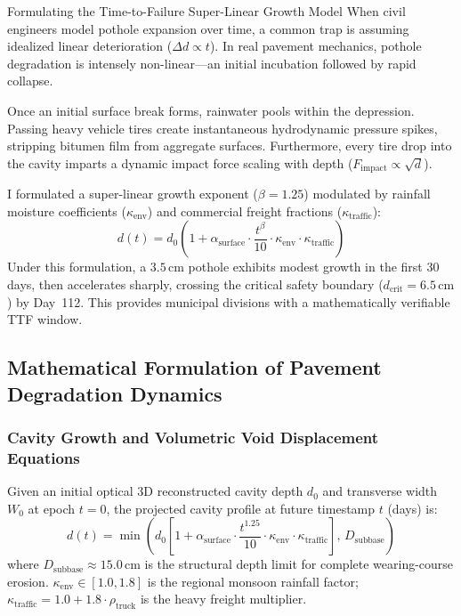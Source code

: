 \begin{designreflection}{Formulating the Time-to-Failure Super-Linear Growth Model}
When civil engineers model pothole expansion over time, a common trap is assuming idealized linear deterioration ($\Delta d \propto t$). In real pavement mechanics, pothole degradation is intensely non-linear---an initial incubation followed by rapid collapse.

Once an initial surface break forms, rainwater pools within the depression. Passing heavy vehicle tires create instantaneous hydrodynamic pressure spikes, stripping bitumen film from aggregate surfaces. Furthermore, every tire drop into the cavity imparts a dynamic impact force scaling with depth ($F_{\text{impact}} \propto \sqrt{d}$).

I formulated a super-linear growth exponent ($\beta = 1.25$) modulated by rainfall moisture coefficients ($\kappa_{\text{env}}$) and commercial freight fractions ($\kappa_{\text{traffic}}$):
\[
d(t) = d_0 \left( 1 + \alpha_{\text{surface}} \cdot \frac{t^\beta}{10} \cdot \kappa_{\text{env}} \cdot \kappa_{\text{traffic}} \right)
\]
Under this formulation, a $3.5\,\text{cm}$ pothole exhibits modest growth in the first 30 days, then accelerates sharply, crossing the critical safety boundary ($d_{\text{crit}} = 6.5\,\text{cm}$) by Day~112. This provides municipal divisions with a mathematically verifiable TTF window.
\end{designreflection}

\subsection{Mathematical Formulation of Pavement Degradation Dynamics}

\subsubsection{Cavity Growth and Volumetric Void Displacement Equations}
Given an initial optical 3D reconstructed cavity depth $d_0$ and transverse width $W_0$ at epoch $t = 0$, the projected cavity profile at future timestamp $t$ (days) is:
\begin{equation}
    d(t) = \min\left( d_0 \left[ 1 + \alpha_{\text{surface}} \cdot \frac{t^{1.25}}{10} \cdot \kappa_{\text{env}} \cdot \kappa_{\text{traffic}} \right], \, D_{\text{subbase}} \right)
    \label{eq:depth_forecast}
\end{equation}
where $D_{\text{subbase}} \approx 15.0\,\text{cm}$ is the structural depth limit for complete wearing-course erosion. $\kappa_{\text{env}} \in [1.0, 1.8]$ is the regional monsoon rainfall factor; $\kappa_{\text{traffic}} = 1.0 + 1.8 \cdot \rho_{\text{truck}}$ is the heavy freight multiplier.

